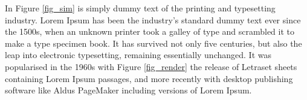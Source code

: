 In Figure \ref{fig_sim} is simply dummy text of the printing and typesetting industry. Lorem Ipsum has been the industry's standard dummy text ever since the 1500s, when an unknown printer took a galley of type and scrambled it to make a type specimen book. It has survived not only five centuries, but also the leap into electronic typesetting, remaining essentially unchanged. It was popularised in the 1960s with Figure \ref{fig_render} the release of Letraset sheets containing Lorem Ipsum passages, and more recently with desktop publishing software like Aldus PageMaker including versions of Lorem Ipsum.